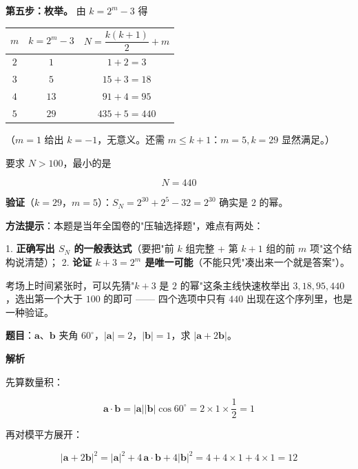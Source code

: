 \textbf{第五步：枚举。} 由 $k=2^{m}-3$ 得

\begin{center}
\begin{tabular}{ccc}
\toprule
$m$ & $k=2^{m}-3$ & $N=\dfrac{k(k+1)}2+m$ \\
\midrule
$2$ & $1$ & $1+2=3$ \\
$3$ & $5$ & $15+3=18$ \\
$4$ & $13$ & $91+4=95$ \\
$5$ & $29$ & $435+5=440$ \\
\bottomrule
\end{tabular}
\end{center}

（$m=1$ 给出 $k=-1$，无意义。还需 $m\le k+1$：$m=5,k=29$ 显然满足。）

要求 $N>100$，最小的是

\[N=440\]

\textbf{验证}（$k=29$，$m=5$）：$S_N=2^{30}+2^{5}-32=2^{30}$  确实是 $2$ 的幂。


\begin{gktip}
\textbf{方法提示}：本题是当年全国卷的"压轴选择题"，难点有两处：

1. \textbf{正确写出 $S_N$ 的一般表达式}（要把"前 $k$ 组完整 + 第 $k+1$ 组的前 $m$ 项"这个结构说清楚）；
2. \textbf{论证 $k+3=2^{m}$ 是唯一可能}（不能只凭"凑出来一个就是答案"）。

考场上时间紧张时，可以先猜"$k+3$ 是 $2$ 的幂"这条主线快速枚举出 $3,18,95,440$，选出第一个大于 $100$ 的即可 —— 四个选项中只有 $440$ 出现在这个序列里，也是一种验证。
\end{gktip}

\par\medskip



\textbf{题目}：$\boldsymbol a$、$\boldsymbol b$ 夹角 $60^\circ$，$|\boldsymbol a|=2$，$|\boldsymbol b|=1$，求 $|\boldsymbol a+2\boldsymbol b|$。

\textbf{解析}

先算数量积：

\[\boldsymbol a\cdot\boldsymbol b=|\boldsymbol a||\boldsymbol b|\cos60^\circ=2\times1\times\frac12=1\]

再对模平方展开：

\[|\boldsymbol a+2\boldsymbol b|^{2}=|\boldsymbol a|^{2}+4\,\boldsymbol a\cdot\boldsymbol b+4|\boldsymbol b|^{2}=4+4\times1+4\times1=12\]

